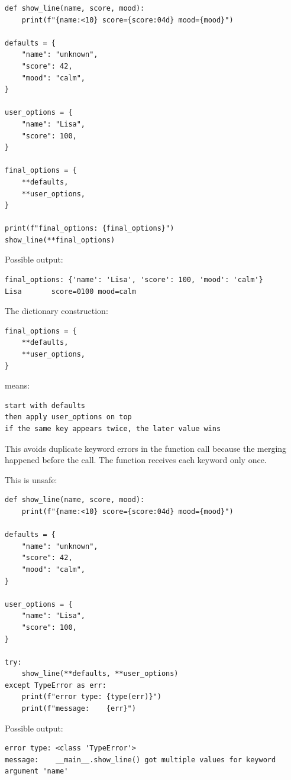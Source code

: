 \begin{verbatim}
def show_line(name, score, mood):
    print(f"{name:<10} score={score:04d} mood={mood}")

defaults = {
    "name": "unknown",
    "score": 42,
    "mood": "calm",
}

user_options = {
    "name": "Lisa",
    "score": 100,
}

final_options = {
    **defaults,
    **user_options,
}

print(f"final_options: {final_options}")
show_line(**final_options)
\end{verbatim}

Possible output:

\begin{verbatim}
final_options: {'name': 'Lisa', 'score': 100, 'mood': 'calm'}
Lisa       score=0100 mood=calm
\end{verbatim}

The dictionary construction:

\begin{verbatim}
final_options = {
    **defaults,
    **user_options,
}
\end{verbatim}

means:

\begin{verbatim}
start with defaults
then apply user_options on top
if the same key appears twice, the later value wins
\end{verbatim}

This avoids duplicate keyword errors in the function call because the merging happened before the call. The function receives each keyword only once.

This is unsafe:

\begin{verbatim}
def show_line(name, score, mood):
    print(f"{name:<10} score={score:04d} mood={mood}")

defaults = {
    "name": "unknown",
    "score": 42,
    "mood": "calm",
}

user_options = {
    "name": "Lisa",
    "score": 100,
}

try:
    show_line(**defaults, **user_options)
except TypeError as err:
    print(f"error type: {type(err)}")
    print(f"message:    {err}")
\end{verbatim}

Possible output:

\begin{verbatim}
error type: <class 'TypeError'>
message:    __main__.show_line() got multiple values for keyword argument 'name'
\end{verbatim}

